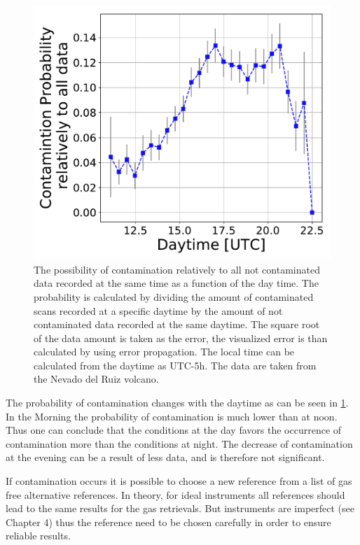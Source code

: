 \begin{figure}
\centering
\includegraphics[width=0.5\linewidth]{Bilder/ConProb}
\caption[The possibility of contamination relatively to all not contaminated data recorded at the same time as a function of the day time. The data are taken from the Nevado del Ruiz volcano.]{The possibility of contamination relatively to all not contaminated data recorded at the same time as a function of the day time. The probability is calculated by dividing the amount of contaminated scans recorded at a specific daytime by the amount of not contaminated data recorded at the same daytime. The square root of the data amount is taken as the error, the visualized error is than calculated by using error propagation. The local time can be calculated from the daytime as UTC-5h. The data are taken from the Nevado del Ruiz volcano.}
\label{fig:conprob}
\end{figure}
The probability of contamination changes with the daytime as can be seen in \cref{fig:conprob}. In the Morning the probability of contamination is much lower than at noon. Thus one can conclude that the conditions at the day favors the occurrence of contamination more than the conditions at night. The decrease of contamination at the evening can be a result of less data, and is therefore not significant.

If contamination occurs it is possible to choose a new reference from a list of gas free alternative references. In theory, for ideal instruments all references should lead to
	the same results for the gas retrievals. But instruments are imperfect (see Chapter
	4) thus the reference need to be chosen carefully in order to ensure reliable results.\\
%
\\

